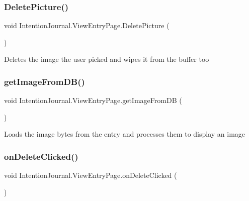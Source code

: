 \subsubsection{\texorpdfstring{Delete\+Picture()}{DeletePicture()}}
{\footnotesize\ttfamily void Intention\+Journal.\+View\+Entry\+Page.\+Delete\+Picture (\begin{DoxyParamCaption}{ }\end{DoxyParamCaption})\hspace{0.3cm}{\ttfamily [inline]}}



Deletes the image the user picked and wipes it from the buffer too 

\mbox{\label{class_intention_journal_1_1_view_entry_page_ac49daa0a90b73c7c2ec011656cd56274}} 
\subsubsection{\texorpdfstring{get\+Image\+From\+D\+B()}{getImageFromDB()}}
{\footnotesize\ttfamily void Intention\+Journal.\+View\+Entry\+Page.\+get\+Image\+From\+DB (\begin{DoxyParamCaption}{ }\end{DoxyParamCaption})\hspace{0.3cm}{\ttfamily [inline]}}



Loads the image bytes from the entry and processes them to display an image 

\mbox{\label{class_intention_journal_1_1_view_entry_page_a9c8e210d72362c9a92d4f15fc1e2c523}} 
\subsubsection{\texorpdfstring{on\+Delete\+Clicked()}{onDeleteClicked()}}
{\footnotesize\ttfamily void Intention\+Journal.\+View\+Entry\+Page.\+on\+Delete\+Clicked (\begin{DoxyParamCaption}{ }\end{DoxyParamCaption})\hspace{0.3cm}{\ttfamily [inline]}}




